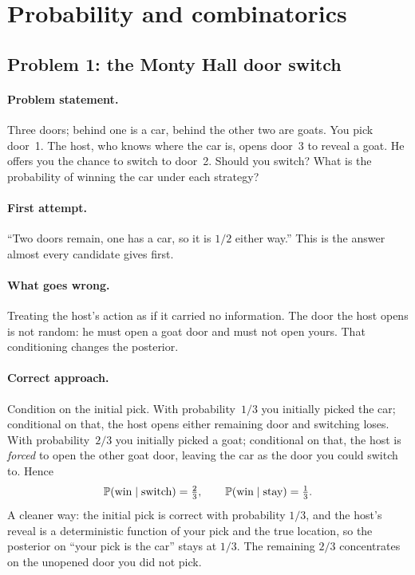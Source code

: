 \section{Probability and combinatorics}
\label{sec:prob-problems}

\subsection{Problem 1: the Monty Hall door switch}
\label{sec:montyhall}

\paragraph{Problem statement.}
Three doors; behind one is a car, behind the other two are goats.
You pick door~1.  The host, who knows where the car is, opens
door~3 to reveal a goat.  He offers you the chance to switch to
door~2.  Should you switch?  What is the probability of winning
the car under each strategy?

\paragraph{First attempt.}
``Two doors remain, one has a car, so it is $1/2$ either way.''
This is the answer almost every candidate gives first.

\paragraph{What goes wrong.}
Treating the host's action as if it carried no information.  The
door the host opens is not random: he must open a goat door and
must not open yours.  That conditioning changes the posterior.

\paragraph{Correct approach.}
Condition on the initial pick.  With probability~$1/3$ you
initially picked the car; conditional on that, the host opens
either remaining door and switching loses.  With probability~$2/3$
you initially picked a goat; conditional on that, the host is
\emph{forced} to open the other goat door, leaving the car as the
door you could switch to.  Hence
\[
\mathbb{P}(\text{win} \mid \text{switch}) = \tfrac{2}{3},
\qquad
\mathbb{P}(\text{win} \mid \text{stay}) = \tfrac{1}{3}.
\]
A cleaner way: the initial pick is correct with probability $1/3$,
and the host's reveal is a deterministic function of your pick and
the true location, so the posterior on ``your pick is the car''
stays at $1/3$.  The remaining $2/3$ concentrates on the unopened
door you did not pick.


